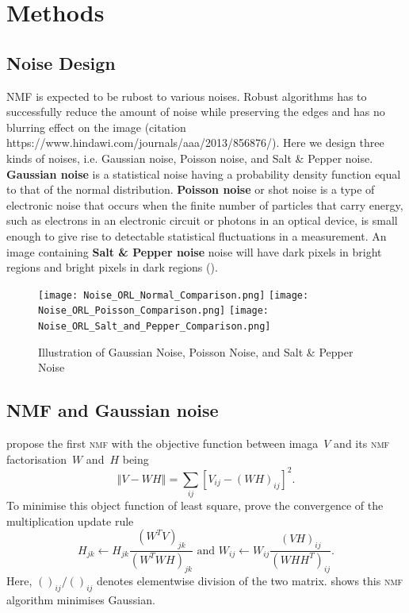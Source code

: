 \section{Methods \label{chapter2}}
\subsection{Noise Design}
\textsc{NMF} is expected to be rubost to various noises. Robust algorithms has to successfully reduce the amount of noise while preserving the edges and has no blurring effect on the image (citation https://www.hindawi.com/journals/aaa/2013/856876/). Here we design three kinds of noises, i.e. Gaussian noise, Poisson noise, and Salt \& Pepper noise. \newline 
\textbf{Gaussian noise} is a statistical noise having a probability density function equal to that of the normal distribution. \textbf{Poisson noise} or shot noise is a type of electronic noise that
occurs when the finite number of particles that carry energy,
such as electrons in an electronic circuit or photons in an optical
device, is small enough to give rise to detectable statistical
fluctuations in a measurement. An image containing \textbf{Salt \& Pepper noise} noise will have dark pixels
in bright regions and bright pixels in dark regions (\citet{sampat2005computer}).
\begin{figure}[h]
	\texttt{[image: Noise\_ORL\_Normal\_Comparison.png]}
	\texttt{[image: Noise\_ORL\_Poisson\_Comparison.png]}
	\texttt{[image: Noise\_ORL\_Salt\_and\_Pepper\_Comparison.png]}
	\caption{Illustration of Gaussian Noise, Poisson Noise, and Salt \& Pepper Noise}
	\label{fig:noise}
\end{figure}
\subsection{NMF and Gaussian noise}
\citet{lee2001algorithms} propose the first \textsc{nmf} with the objective function between imaga~$V$ and its \textsc{nmf} factorisation~$W$ and~$H$ being
\begin{equation*}
  \left\Vert V-WH \right\Vert= \sum_{ij} \left[V_{ij}-(WH)_{ij}\right]^2.
\end{equation*}
To minimise this object function of least square, \citet{lee2001algorithms} prove the convergence of the multiplication update rule
\begin{equation*}
H_{jk}\leftarrow H_{jk}\frac{(W^{T}V)_{jk}}{(W^{T}WH)_{jk}} \text{ and } W_{ij}\leftarrow W_{ij}\frac{(VH)_{ij}}{(WHH^{T})_{ij}}.
\end{equation*}
Here, $()_{ij}/()_{ij}$ denotes elementwise division of the two matrix. \citet{liu2015performance} shows this \textsc{nmf} algorithm minimises Gaussian.


